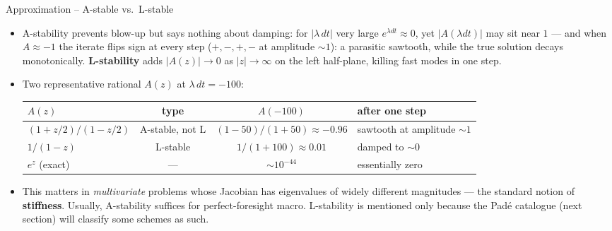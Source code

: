 \documentclass[11pt,aspectratio=169]{beamer}
\begin{document}
\begin{frame}{Approximation -- A-stable vs.\ L-stable}

\begin{itemize}

\item A-stability prevents blow-up but says nothing about damping:
  for $|\lambda\, dt|$ very large $e^{\lambda dt}\approx 0$, yet
  $|A(\lambda dt)|$ may sit near $1$ — and when $A\approx -1$ the
  iterate flips sign at every step ($+,-,+,-$ at amplitude $\sim\!1$):
  a parasitic sawtooth, while the true solution decays monotonically.
  \textbf{L-stability} adds $|A(z)|\to 0$ as $|z|\to\infty$ on the
  left half-plane, killing fast modes in one step.\newline

\item Two representative rational $A(z)$ at $\lambda\, dt = -100$:
  \begin{center}
    \scriptsize
    \renewcommand{\arraystretch}{1.3}
    \begin{tabular}{lccl}
      \toprule
      $A(z)$ & type & $A(-100)$ & after one step \\
      \midrule
      $(1+z/2)/(1-z/2)$ & A-stable, not L &
        $(1{-}50)/(1{+}50) \approx -0.96$ &
        sawtooth at amplitude $\sim\!1$ \\
      $1/(1-z)$ & L-stable &
        $1/(1{+}100) \approx 0.01$ &
        damped to $\sim 0$ \\
      $e^z$ (exact) & — & $\sim 10^{-44}$ & essentially zero \\
      \bottomrule
    \end{tabular}
  \end{center}

\medskip
  
\item This matters in \emph{multivariate} problems whose Jacobian has
  eigenvalues of widely different magnitudes — the standard notion of
  \textbf{stiffness}. Usually, A-stability suffices for
  perfect-foresight macro. L-stability is mentioned only because the
  Padé catalogue (next section) will classify some schemes as such.

\end{itemize}

\end{frame}
\end{document}
